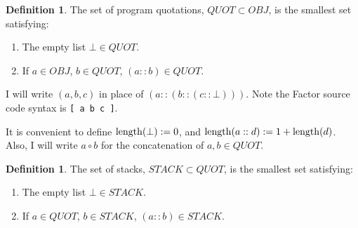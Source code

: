 \documentclass{amsart}
\theoremstyle{plain}
\theoremstyle{definition}
\newtheorem{definition}[theorem]{Definition}
\def\leng{\mathop{\rm length}}
\begin{document}
\begin{definition}
The set of program quotations, $QUOT \subset OBJ$, is the smallest set satisfying:

\begin{enumerate}

\item The empty list $\bot \in QUOT$.
\item If $a \in OBJ$, $b \in QUOT$, $(a::b) \in QUOT$.

\end{enumerate}

I will write $(a,b,c)$ in place of $(a::(b::(c::\bot)))$. Note the Factor source code
syntax is \texttt{[ a b c ]}.

It is convenient to define $\leng(\bot) := 0$, and $\leng(a::d):=1+\leng(d)$. Also, I will write $a\circ b$ for the concatenation of $a,b \in QUOT$.

\end{definition}

\begin{definition}
The set of stacks, $STACK \subset QUOT$, is the smallest set satisfying:

\begin{enumerate}

\item The empty list $\bot \in STACK$.
\item If $a \in QUOT$, $b \in STACK$, $(a::b) \in STACK$.

\end{enumerate}

\end{definition}
\end{document}
